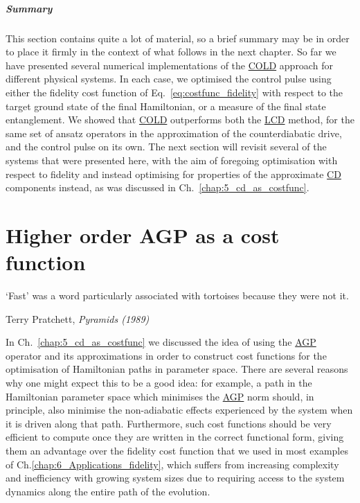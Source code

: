 \documentclass[a4paper,oneside,11pt]{book}
\newcommand{\acrref}[1]{\hyperref[acr:#1]{#1}}
\begin{document}
\paragraph{Summary} This section contains quite a lot of material, so a brief summary may be in order to place it firmly in the context of what follows in the next chapter. So far we have presented several numerical implementations of the \acrref{COLD} approach for different physical systems. In each case, we optimised the control pulse using either the fidelity cost function of Eq.~\eqref{eq:costfunc_fidelity} with respect to the target ground state of the final Hamiltonian, or a measure of the final state entanglement. We showed that \acrref{COLD} outperforms both the \acrref{LCD} method, for the same set of ansatz operators in the approximation of the counterdiabatic drive, and the control pulse on its own. The next section will revisit several of the systems that were presented here, with the aim of foregoing optimisation with respect to fidelity and instead optimising for properties of the approximate \acrref{CD} components instead, as was discussed in Ch.~\ref{chap:5_cd_as_costfunc}.
\chapter{Higher order AGP as a cost function}\label{chap:7_higher_order_agp}

\epigraph{`Fast' was a word particularly associated with tortoises because they were not it.}{Terry Pratchett, \emph{Pyramids (1989)}}

In Ch.~\ref{chap:5_cd_as_costfunc} we discussed the idea of using the \acrref{AGP} operator and its approximations in order to construct cost functions for the optimisation of Hamiltonian paths in parameter space. There are several reasons why one might expect this to be a good idea: for example, a path in the Hamiltonian parameter space which minimises the \acrref{AGP} norm should, in principle, also minimise the non-adiabatic effects experienced by the system when it is driven along that path. Furthermore, such cost functions should be very efficient to compute once they are written in the correct functional form, giving them an advantage over the fidelity cost function that we used in most examples of Ch.\ref{chap:6_Applications_fidelity}, which suffers from increasing complexity and inefficiency with growing system sizes due to requiring access to the system dynamics along the entire path of the evolution.
\end{document}

